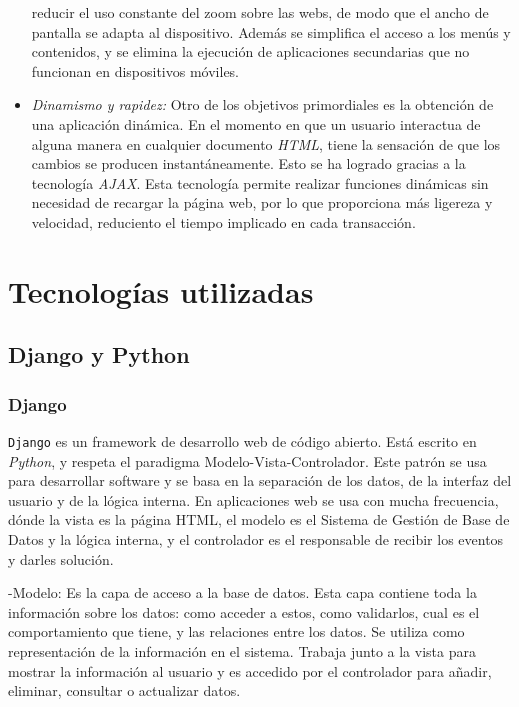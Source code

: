 \documentclass[a4paper, 12pt]{book}
\begin{document}
\begin{itemize}
  reducir el uso constante del zoom sobre las webs, de modo que el ancho de pantalla se adapta al dispositivo. Adem\'as se simplifica el 
  acceso a los men\'us y contenidos, y se elimina la ejecuci\'on de aplicaciones secundarias que no funcionan en dispositivos m\'oviles.
  \item \textit {Dinamismo y rapidez:} Otro de los objetivos primordiales es la obtenci\'on de una aplicaci\'on din\'amica. En el momento en que un 
  usuario interactua de alguna manera en cualquier documento \textit{HTML}, tiene la sensaci\'on de que los cambios se producen instant\'aneamente. Esto se ha logrado 
  gracias a la tecnolog\'ia \textit{AJAX}. Esta tecnolog\'ia permite realizar funciones din\'amicas sin necesidad de recargar la p\'agina web, por lo que proporciona 
  m\'as ligereza y velocidad, reduciento el tiempo implicado en cada transacci\'on.
\end{itemize}



\cleardoublepage
\chapter{Tecnolog\'ias utilizadas}

\section{Django y Python} 
\label{sec:djangopython}

\subsection{Django} 
\label{subsec:django}
\texttt{Django} es un framework de desarrollo web de c\'odigo abierto. Est\'a escrito en \textit{Python}, y respeta el paradigma Modelo-Vista-Controlador. 
Este patr\'on se usa para desarrollar software y se basa en la separaci\'on de los datos, de la interfaz del usuario y de la l\'ogica interna. 
En aplicaciones web se usa con mucha frecuencia, d\'onde la vista es la p\'agina HTML, el modelo es el Sistema de Gesti\'on de Base de Datos y la 
l\'ogica interna, y el controlador es el responsable de recibir los eventos y darles soluci\'on.

-Modelo: Es la capa de acceso a la base de datos. Esta capa contiene toda la informaci\'on sobre los datos: como acceder a estos, como validarlos, 
cual es el comportamiento que tiene, y las relaciones entre los datos. Se utiliza como representaci\'on de la informaci\'on en el sistema. Trabaja junto 
a la vista para mostrar la informaci\'on al usuario y es accedido por el controlador para a\~nadir, eliminar, consultar o actualizar datos. 
     
\end{document}
